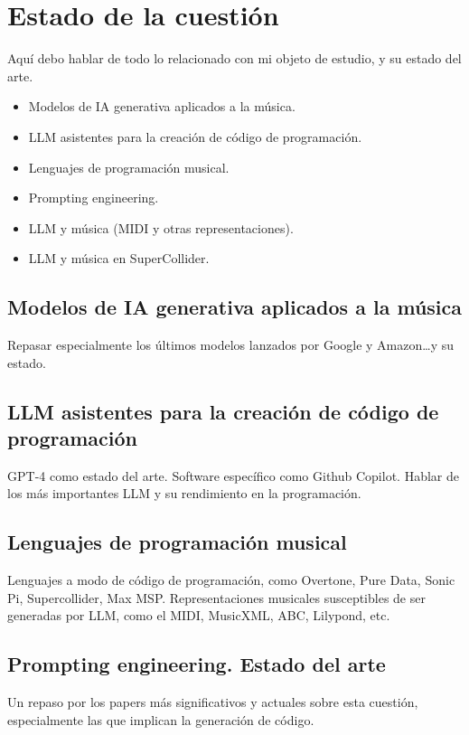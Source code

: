\chapter{Estado de la cuestión}
\label{chap:estado_cuestion}

Aquí debo hablar de todo lo relacionado con mi objeto de estudio, y su estado del arte.


\begin{itemize}
    \item Modelos de IA generativa aplicados a la música.
    \item LLM asistentes para la creación de código de programación.
    \item Lenguajes de programación musical.
    \item Prompting engineering.
    \item LLM y música (MIDI y otras representaciones).
    \item LLM y música en SuperCollider.
\end{itemize}

\section{Modelos de IA generativa aplicados a la música}
    Repasar especialmente los últimos modelos lanzados por Google y Amazon\dots y su estado.

\section{LLM asistentes para la creación de código de programación}
    GPT-4 como estado del arte. Software específico como Github Copilot. Hablar de los más importantes LLM y su rendimiento en la programación.

\section{Lenguajes de programación musical}
    Lenguajes a modo de código de programación, como Overtone, Pure Data, Sonic Pi, Supercollider, Max MSP. Representaciones musicales susceptibles de ser generadas por LLM, como el MIDI, MusicXML, ABC, Lilypond, etc.

\section*{Prompting engineering. Estado del arte}
    Un repaso por los papers más significativos y actuales sobre esta cuestión, especialmente las que implican la generación de código.

